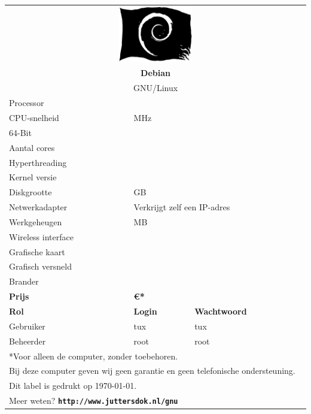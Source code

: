 \documentclass[a4paper,14pt]{extarticle}
\begin{document}

\begin{center}
	\begin{tabular}{ p{6cm} p{6cm}l }
	\multicolumn{3}{c}{\includegraphics[width=0.25\textwidth]{pirateswirl}} \\
	\multicolumn{3}{c}{\Huge\bf{Debian \debiancode{} \debianversion}}       \\
	\multicolumn{3}{c}{\LARGE{GNU/Linux}}\\[2em]
	Processor          & \multicolumn{2}{l}{\cpumodel{}}                   \\
	CPU-snelheid       & \multicolumn{2}{l}{\cpuspeed{} MHz}               \\
	64-Bit             & \multicolumn{2}{l}{\bitssixtyfour{}}              \\
	Aantal cores       & \multicolumn{2}{l}{\corecount{}}                  \\
	Hyperthreading     & \multicolumn{2}{l}{\hyperthreading{}}             \\
	Kernel versie      & \multicolumn{2}{l}{{}}              \\
	Diskgrootte        & \multicolumn{2}{l}{\disksize{} GB}                \\
  Netwerkadapter     & \multicolumn{2}{l}{Verkrijgt zelf een IP-adres}   \\
	Werkgeheugen       & \multicolumn{2}{l}{\memsize{} MB}                 \\
	Wireless interface & \multicolumn{2}{l}{\wireless{}}                   \\
	Grafische kaart    & \multicolumn{2}{l}{\graphics{}}                   \\
	Grafisch versneld  & \multicolumn{2}{l}{\accelerated{}}                \\
	Brander            & \multicolumn{2}{l}{\burner{}}                     \\[2em]
	{\LARGE \bf Prijs} & \multicolumn{2}{l}{\LARGE \bf \euro{}{\price{}*}} \\[1.5em] 
	\textbf{Rol}       & \textbf{Login} & \textbf{Wachtwoord}               \\
	Gebruiker          & tux            & tux                               \\
	Beheerder          & root					  & root                              \\[2em]
	\multicolumn{3}{l}{*Voor alleen de computer, zonder toebehoren.}        \\
	\multicolumn{3}{l}{Bij deze computer geven wij geen garantie en geen telefonische ondersteuning.}\\
  \multicolumn{3}{l}{Dit label is gedrukt op \today.}\\[1.5em]
	\multicolumn{3}{l}{Meer weten? \textbf{\texttt{http://www.juttersdok.nl/gnu}}}\\
\end{tabular}
\end{center}
\end{document}
